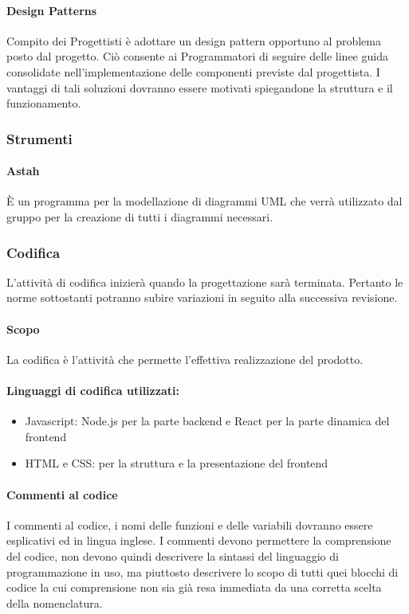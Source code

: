 \documentclass[11pt,a4paper]{article}
\begin{document}
{	\paragraph{Design Patterns\\} 
	Compito dei Progettisti è adottare un design pattern opportuno al problema posto dal progetto. Ciò consente ai Programmatori di seguire delle linee guida consolidate nell'implementazione delle componenti previste dal progettista. I vantaggi di tali soluzioni dovranno essere motivati spiegandone la struttura e il funzionamento.
	\subsubsection{Strumenti}
	\paragraph{Astah\\}
	È un programma per la modellazione di diagrammi UML che verrà utilizzato dal gruppo per la creazione di tutti i diagrammi necessari.
	
	\subsubsection{Codifica}
	L'attività di codifica inizierà quando la progettazione sarà terminata. Pertanto le norme sottostanti potranno subire variazioni in seguito alla successiva revisione.
	
	\paragraph{Scopo\\}
	La codifica è l'attività che permette l'effettiva realizzazione del prodotto.
	\paragraph{Linguaggi di codifica utilizzati:}
	\begin{itemize}
		\item Javascript: Node.js per la parte backend e React per la parte dinamica del frontend
		\item HTML e CSS: per la struttura e la presentazione del frontend
	\end{itemize}
	
	\paragraph{Commenti al codice\\}
	I commenti al codice, i nomi delle funzioni e delle variabili dovranno essere esplicativi ed in lingua inglese.
	I commenti devono permettere la comprensione del codice, non
	devono quindi descrivere la sintassi del linguaggio di programmazione in uso, ma piuttosto descrivere lo scopo di tutti quei blocchi di codice la
	cui comprensione non sia già resa immediata da una corretta scelta della nomenclatura.
	
}
\end{document}
